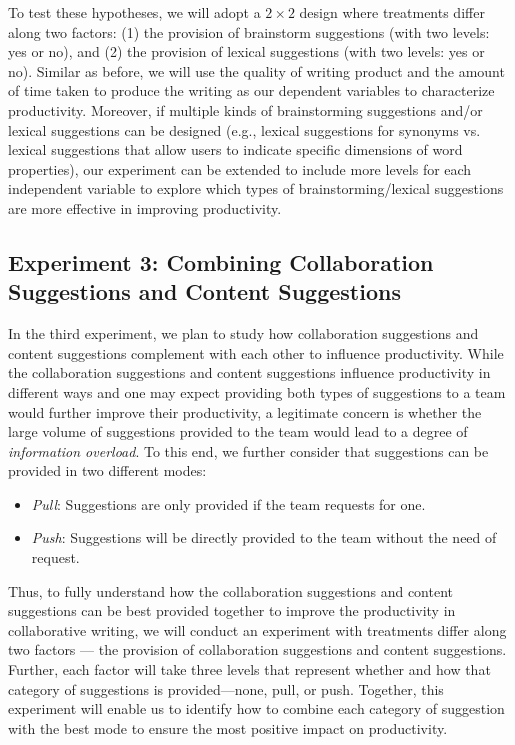 To test these hypotheses, we will adopt a $2\times 2$ design where treatments differ along two factors: (1) the provision of brainstorm suggestions (with two levels: yes or no), and (2) the provision of lexical suggestions (with two levels: yes or no). Similar as before, we will use the quality of writing product and the amount of time taken to produce the writing as our dependent variables to characterize productivity. Moreover, if multiple kinds of brainstorming suggestions and/or lexical suggestions can be designed (e.g., lexical suggestions for synonyms vs. lexical suggestions that allow users to indicate specific dimensions of word properties),
our experiment can be 
extended to include more levels for each independent variable to explore which types of brainstorming/lexical suggestions are more effective in improving productivity.

\subsection{Experiment 3: Combining Collaboration Suggestions and Content Suggestions}
\label{sec:exp3}

In the third experiment, we plan to study how collaboration suggestions and content suggestions complement with each other to influence productivity. While the collaboration suggestions and content suggestions influence productivity in different ways and one may expect providing both types of suggestions to a team would further improve their productivity, a legitimate concern is whether the large volume of suggestions provided to the team would lead to a degree of {\em information overload}. To this end, we further consider that suggestions can be provided in two different modes:
\begin{itemize}[leftmargin=*,noitemsep,topsep=0pt,parsep=0pt,partopsep=0pt]
\item {\em Pull}: Suggestions are only provided if the team requests for one.
\item {\em Push}: Suggestions will be directly provided to the team without the need of request.
\end{itemize}
Thus, to fully understand how the collaboration suggestions and content suggestions can be best provided together to improve the productivity in collaborative writing, we will conduct an experiment with treatments differ along two factors --- the provision of collaboration suggestions and content suggestions. Further, each factor will take three levels that represent whether and how that category of suggestions is provided---none, pull, or push. Together, this experiment will enable us to identify how to combine each category of suggestion with the best mode to ensure the most positive impact on productivity. 

